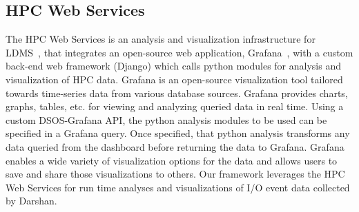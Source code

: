 \subsection{HPC Web Services}
The HPC Web Services is an analysis and visualization infrastructure for 
LDMS~\cite{ClusterAV}, that integrates an open-source web application, 
Grafana~\cite{grafana-website}, with a custom back-end web framework (Django)
which calls python modules for analysis and visualization of HPC data. Grafana 
is an open-source visualization tool tailored towards time-series data from 
various database sources. Grafana provides charts, graphs, tables, etc. for 
viewing and analyzing queried data in real time. Using a custom DSOS-Grafana API, 
the python analysis modules to be used can be specified in a Grafana query. 
Once specified, that python analysis transforms any data queried from the dashboard 
before returning the data to Grafana. Grafana enables a wide variety of visualization 
options for the data and allows users to save and share those visualizations to others. 
Our framework leverages the HPC Web Services for run time analyses and visualizations 
of I/O event data collected by Darshan.

